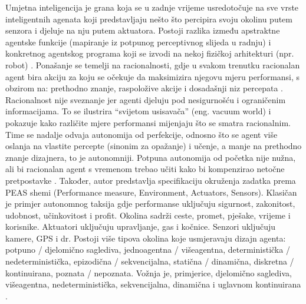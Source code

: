 \documentclass[]{foi}
\begin{document}
Umjetna inteligencija je grana koja se u zadnje vrijeme usredotočuje na sve vrste inteligentnih agenata koji predstavljaju nešto što percipira svoju okolinu putem senzora i djeluje na nju 
putem aktuatora. Postoji razlika između apstraktne agentske funkcije (mapiranje iz potpunog perceptivnog slijeda u radnju) i konkretnog agentskog programa koji se izvodi na nekoj fizičkoj 
arhitekturi (npr. robot) \cite[str. 55 i 56]{russell2022ai}. Ponašanje se temelji na racionalnosti, gdje u svakom trenutku racionalan agent bira akciju za koju se očekuje da maksimizira 
njegovu mjeru performansi, s obzirom na: prethodno znanje, raspoložive akcije i dosadašnji niz percepata \cite[str. 58 i 59]{russell2022ai}. Racionalnost nije sveznanje 
jer agenti djeluju pod nesigurnošću i ograničenim informacijama. To se ilustrira “svijetom usisavača” (eng. vacuum world) i pokazuje kako različite mjere performansi mijenjaju što se 
smatra racionalnim. Time se nadalje odvaja autonomija od perfekcije, odnosno što se agent više oslanja na vlastite percepte (sinonim za opažanje) i učenje, a manje na prethodno znanje dizajnera, to je autonomniji.
Potpuna autonomija od početka nije nužna, ali bi racionalan agent s vremenom trebao učiti kako bi kompenzirao netočne pretpostavke \cite[str. 60]{russell2022ai}.
Također, autor predstavlja specifikaciju okruženja zadatka prema PEAS shemi (Performance measure, Environment, Actuators, Sensors). Klasičan je primjer autonomnog taksija gdje performanse uključuju 
sigurnost, zakonitost, udobnost, učinkovitost i profit. Okolina sadrži ceste, promet, pješake, vrijeme i korisnike. Aktuatori uključuju upravljanje, gas i kočnice. Senzori uključuju kamere, 
GPS i dr. Postoji više tipova okolina koje usmjeravaju dizajn agenta: potpuno / djelomično saglediva, jednoagentna / višeagentna, deterministička / nedeterministička, epizodična / 
sekvencijalna, statična / dinamična, diskretna / kontinuirana, poznata / nepoznata. Vožnja je, primjerice, djelomično saglediva, višeagentna, nedeterministička, sekvencijalna, dinamična i 
uglavnom kontinuirana \cite[str. 60 - 65]{russell2022ai}. 
\end{document}
